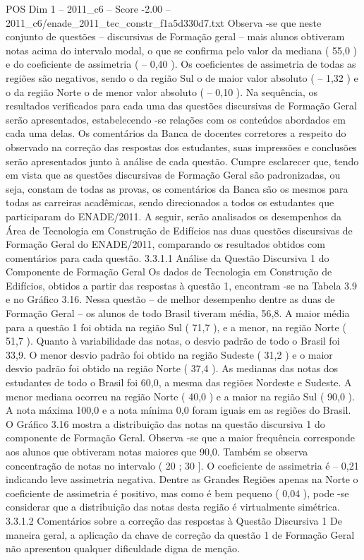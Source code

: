 \begin{textsample}{POS Dim 1 – 2011\_c6 – Score -2.00 – 2011\_c6/enade\_2011\_tec\_constr\_f1a5d330d7.txt}
Observa -se que neste conjunto de questões – discursivas de Formação geral – mais alunos obtiveram notas acima do intervalo modal, o que se confirma pelo valor da mediana ( 55,0 ) e do coeficiente de assimetria ( – 0,40 ).
Os coeficientes de assimetria de todas as regiões são negativos, sendo o da região Sul o de maior valor absoluto ( – 1,32 ) e o da região Norte o de menor valor absoluto ( – 0,10 ).
Na sequência, os resultados verificados para cada uma das questões discursivas de Formação Geral serão apresentados, estabelecendo -se relações com os conteúdos abordados em cada uma delas.
Os comentários da Banca de docentes corretores a respeito do observado na correção das respostas dos estudantes, suas impressões e conclusões serão apresentados junto à análise de cada questão.
Cumpre esclarecer que, tendo em vista que as questões discursivas de Formação Geral são padronizadas, ou seja, constam de todas as provas, os comentários da Banca são os mesmos para todas as carreiras acadêmicas, sendo direcionados a todos os estudantes que participaram do ENADE/2011.
A seguir, serão analisados os desempenhos da Área de Tecnologia em Construção de Edifícios nas duas questões discursivas de Formação Geral do ENADE/2011, comparando os resultados obtidos com comentários para cada questão. 3.3.1.1 Análise da Questão Discursiva 1 do Componente de Formação Geral Os dados de Tecnologia em Construção de Edifícios, obtidos a partir das respostas à questão 1, encontram -se na Tabela 3.9 e no Gráfico 3.16.
Nessa questão – de melhor desempenho dentre as duas de Formação Geral – os alunos de todo Brasil tiveram média, 56,8.
A maior média para a questão 1 foi obtida na região Sul ( 71,7 ), e a menor, na região Norte ( 51,7 ).
Quanto à variabilidade das notas, o desvio padrão de todo o Brasil foi 33,9.
O menor desvio padrão foi obtido na região Sudeste ( 31,2 ) e o maior desvio padrão foi obtido na região Norte ( 37,4 ).
As medianas das notas dos estudantes de todo o Brasil foi 60,0, a mesma das regiões Nordeste e Sudeste.
A menor mediana ocorreu na região Norte ( 40,0 ) e a maior na região Sul ( 90,0 ).
A nota máxima 100,0 e a nota mínima 0,0 foram iguais em as regiões do Brasil.
O Gráfico 3.16 mostra a distribuição das notas na questão discursiva 1 do componente de Formação Geral.
Observa -se que a maior frequência corresponde aos alunos que obtiveram notas maiores que 90,0.
Também se observa concentração de notas no intervalo ( 20 ; 30 ].
O coeficiente de assimetria é – 0,21 indicando leve assimetria negativa.
Dentre as Grandes Regiões apenas na Norte o coeficiente de assimetria é positivo, mas como é bem pequeno ( 0,04 ), pode -se considerar que a distribuição das notas desta região é virtualmente simétrica. 3.3.1.2 Comentários sobre a correção das respostas à Questão Discursiva 1 De maneira geral, a aplicação da chave de correção da questão 1 de Formação Geral não apresentou qualquer dificuldade digna de menção.

\end{textsample}
